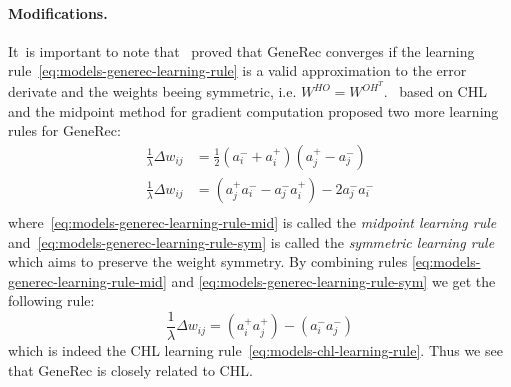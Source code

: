 \paragraph{Modifications.}
\label{sec:our-learning-rules}
\label{sec:models-generec-modifications} 
It~is important to note that~\citet{o1996bio} proved that GeneRec converges if the learning rule~\ref{eq:models-generec-learning-rule} is a valid approximation to the error derivate and the weights beeing symmetric, i.e. $W^{HO} = W^{OH^{T}}$.~\citet{o1996bio} based on CHL and the midpoint method for gradient computation proposed two more learning rules for GeneRec:
\begin{align}
  \label{eq:models-generec-learning-rule-mid}
  \frac{1}{\lambda} \Delta w_{ij} &=  \frac{1}{2}(a^{-}_i + a^{+}_i)(a^{+}_j - a^{-}_j) \\
  \label{eq:models-generec-learning-rule-sym}
  \frac{1}{\lambda} \Delta w_{ij} &=  (a^{+}_j a^{-}_i - a^{-}_j a^{+}_i) - 2a^{-}_j a^{-}_i \\
\end{align}
where~\ref{eq:models-generec-learning-rule-mid} is called the \emph{midpoint learning rule} and~\ref{eq:models-generec-learning-rule-sym} is called the \emph{symmetric learning rule} which aims to preserve the weight symmetry. By combining rules \ref{eq:models-generec-learning-rule-mid} and \ref{eq:models-generec-learning-rule-sym} we get the following rule: 
\begin{equation}
  \label{eq:models-generec-learning-rule-chl}
  \frac{1}{\lambda} \Delta w_{ij} =  (a^{+}_i a^{+}_j) - (a^{-}_i a^{-}_j)
\end{equation}
which is indeed the CHL learning rule~\ref{eq:models-chl-learning-rule}. Thus we see that GeneRec is closely related to CHL. 


